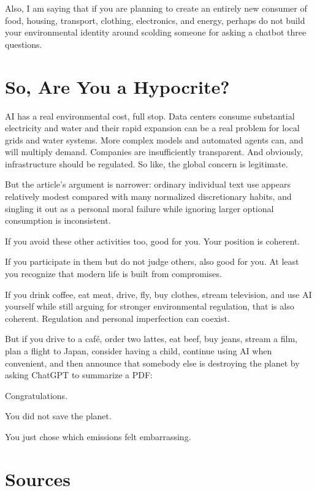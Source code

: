 \documentclass{article}
\begin{document}
Also, I am saying that if you are planning to create an entirely new consumer of food, housing, transport, clothing, electronics, and energy, perhaps do not build your environmental identity around scolding someone for asking a chatbot three questions.

\section*{So, Are You a Hypocrite?}

AI has a real environmental cost, full stop. Data centers consume substantial electricity and water and their rapid expansion can be a real problem for local grids and water systems. More complex models and automated agents can, and will multiply demand. Companies are insufficiently transparent. And obviously, infrastructure should be regulated. So like, the global concern is legitimate.

But the article's argument is narrower: ordinary individual text use appears relatively modest compared with many normalized discretionary habits, and singling it out as a personal moral failure while ignoring larger optional consumption is inconsistent.

If you avoid these other activities too, good for you. Your position is coherent.

If you participate in them but do not judge others, also good for you. At least you recognize that modern life is built from compromises.

If you drink coffee, eat meat, drive, fly, buy clothes, stream television, and use AI yourself while still arguing for stronger environmental regulation, that is also coherent. Regulation and personal imperfection can coexist.

But if you drive to a café, order two lattes, eat beef, buy jeans, stream a film, plan a flight to Japan, consider having a child, continue using AI when convenient, and then announce that somebody else is destroying the planet by asking ChatGPT to summarize a PDF:

Congratulations.

You did not save the planet.

You just chose which emissions felt embarrassing.

\section*{Sources}
\end{document}
